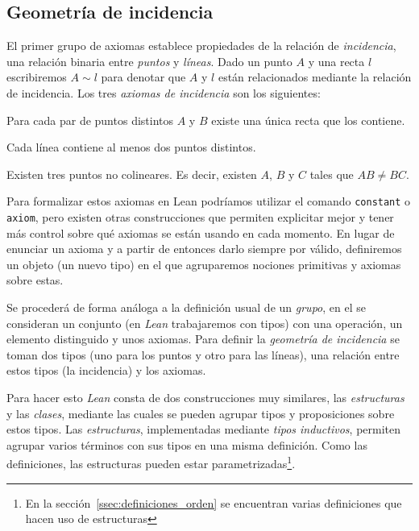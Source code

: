 \subsection{Geometría de incidencia}

El primer grupo de axiomas establece propiedades de la relación de
\textit{incidencia}, una relación binaria entre \textit{puntos} y
\textit{líneas}. Dado un punto $A$ y una recta $l$ escribiremos $A\sim l$ para
denotar que $A$ y $l$ están relacionados mediante la relación de incidencia.
Los tres \textit{axiomas de incidencia} son los siguientes:

\begin{ax}\label{ax:I1}
	Para cada par de puntos distintos $A$ y $B$ existe una única recta que los
	contiene.
\end{ax}

\begin{ax}\label{ax:I2}
	Cada línea contiene al menos dos puntos distintos.
\end{ax}

\begin{ax}\label{ax:I3}
	Existen tres puntos no colineares. Es decir, existen $A$, $B$ y $C$ tales que
	$AB\neq BC$.
\end{ax}

Para formalizar estos axiomas en Lean podríamos utilizar el comando
\lstinline{constant} o \lstinline{axiom}, pero existen otras construcciones que
permiten explicitar mejor y tener más control sobre qué axiomas se están
usando en cada momento. En lugar de enunciar un axioma y a partir de entonces
darlo siempre por válido, definiremos un objeto (un nuevo tipo) en el que
agruparemos nociones primitivas y axiomas sobre estas.

Se procederá de forma análoga a la definición usual de un \textit{grupo}, en el
se consideran un conjunto (en \textit{Lean} trabajaremos con tipos) con una
operación, un elemento distinguido y unos axiomas. Para definir la
\textit{geometría de incidencia} se toman dos tipos (uno para los puntos y otro
para las líneas), una relación entre estos tipos (la incidencia) y los axiomas.

Para hacer esto \textit{Lean} consta de dos construcciones muy similares, las
\textit{estructuras} y las \textit{clases}, mediante las cuales se pueden
agrupar tipos y proposiciones sobre estos tipos. Las \textit{estructuras},
implementadas mediante \textit{tipos inductivos}, permiten agrupar varios
términos con sus tipos en una misma definición. Como las definiciones, las
estructuras pueden estar parametrizadas\footnote{En la
	sección~\ref{ssec:definiciones_orden} se encuentran varias definiciones que
	hacen uso de estructuras}.

